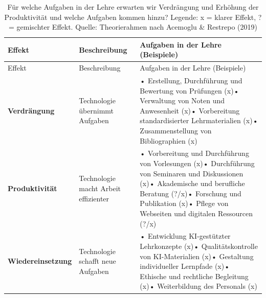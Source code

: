 \documentclass[
  ngerman,
  letterpaper,
  DIV=11]{scrreprt}
\begin{document}
\begin{longtable}[]{@{}
  >{\raggedright\arraybackslash}p{}
  >{\raggedright\arraybackslash}p{}
  >{\raggedright\arraybackslash}p{}@{}}
\caption{Für welche Aufgaben in der Lehre erwarten wir Verdrängung und
Erhöhung der Produktivität und welche Aufgaben kommen hinzu? Legende: x
= klarer Effekt, ? = gemischter Effekt. Quelle: Theorierahmen nach
Acemoglu \& Restrepo (2019)}\label{tbl-acemoglu}\tabularnewline
\toprule\noalign{}
\begin{minipage}[b]{\linewidth}\raggedright
Effekt
\end{minipage} & \begin{minipage}[b]{\linewidth}\raggedright
Beschreibung
\end{minipage} & \begin{minipage}[b]{\linewidth}\raggedright
Aufgaben in der Lehre (Beispiele)
\end{minipage} \\
\midrule\noalign{}
\endfirsthead
\toprule\noalign{}
\begin{minipage}[b]{\linewidth}\raggedright
Effekt
\end{minipage} & \begin{minipage}[b]{\linewidth}\raggedright
Beschreibung
\end{minipage} & \begin{minipage}[b]{\linewidth}\raggedright
Aufgaben in der Lehre (Beispiele)
\end{minipage} \\
\midrule\noalign{}
\endhead
\bottomrule\noalign{}
\endlastfoot
\textbf{Verdrängung} & Technologie übernimmt Aufgaben & • Erstellung,
Durchführung und Bewertung von Prüfungen (x)• Verwaltung von Noten und
Anwesenheit (x)• Vorbereitung standardisierter Lehrmaterialien (x)•
Zusammenstellung von Bibliographien (x) \\
\textbf{Produktivität} & Technologie macht Arbeit effizienter & •
Vorbereitung und Durchführung von Vorlesungen (x)• Durchführung von
Seminaren und Diskussionen (x)• Akademische und berufliche Beratung
(?/x)• Forschung und Publikation (x)• Pflege von Webseiten und digitalen
Ressourcen (?/x) \\
\textbf{Wiedereinsetzung} & Technologie schafft neue Aufgaben & •
Entwicklung KI-gestützter Lehrkonzepte (x)• Qualitätskontrolle von
KI-Materialien (x)• Gestaltung individueller Lernpfade (x)• Ethische und
rechtliche Begleitung (x)• Weiterbildung des Personals (x) \\
\end{longtable}
\end{document}
